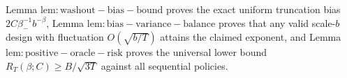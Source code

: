 Lemma \(\mathrm{lem:washout-bias-bound}\) proves the exact uniform truncation bias \(2C\beta_-^{-1}b^{-\beta}\), Lemma \(\mathrm{lem:bias-variance-balance}\) proves that any valid scale-\(b\) design with fluctuation \(O(\sqrt{b/T})\) attains the claimed exponent, and Lemma \(\mathrm{lem:positive-oracle-risk}\) proves the universal lower bound \(R_T(\beta;C)\ge B/\sqrt{3T}\) against all sequential policies.